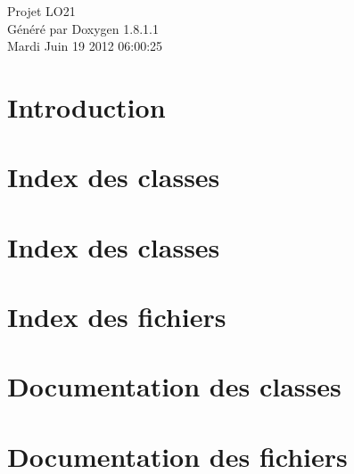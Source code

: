 \documentclass{book}
\begin{document}
\hypersetup{pageanchor=false,citecolor=blue}
\begin{titlepage}
\vspace*{7cm}
\begin{center}
{\Large Projet L\-O21 }\\
\vspace*{1cm}
{\large Généré par Doxygen 1.8.1.1}\\
\vspace*{0.5cm}
{\small Mardi Juin 19 2012 06:00:25}\\
\end{center}
\end{titlepage}
\clearemptydoublepage
{}
\tableofcontents
\clearemptydoublepage
{}
\hypersetup{pageanchor=true,citecolor=blue}
\chapter{Introduction}
\label{index}\hypertarget{index}{}
\chapter{Index des classes}

\chapter{Index des classes}

\chapter{Index des fichiers}

\chapter{Documentation des classes}

















\chapter{Documentation des fichiers}



















\printindex
\end{document}
